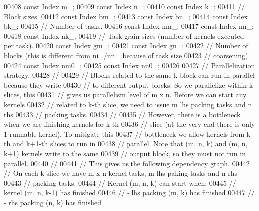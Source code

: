 \begin{DoxyCode}
00408     \textcolor{keyword}{const} Index m\_;
00409     \textcolor{keyword}{const} Index n\_;
00410     \textcolor{keyword}{const} Index k\_;
00411     \textcolor{comment}{// Block sizes.}
00412     \textcolor{keyword}{const} Index bm\_;
00413     \textcolor{keyword}{const} Index bn\_;
00414     \textcolor{keyword}{const} Index bk\_;
00415     \textcolor{comment}{// Number of tasks.}
00416     \textcolor{keyword}{const} Index nm\_;
00417     \textcolor{keyword}{const} Index nn\_;
00418     \textcolor{keyword}{const} Index nk\_;
00419     \textcolor{comment}{// Task grain sizes (number of kernels executed per task).}
00420     \textcolor{keyword}{const} Index gm\_;
00421     \textcolor{keyword}{const} Index gn\_;
00422     \textcolor{comment}{// Number of blocks (this is different from ni\_/nn\_ because of task size}
00423     \textcolor{comment}{// coarsening).}
00424     \textcolor{keyword}{const} Index nm0\_;
00425     \textcolor{keyword}{const} Index nn0\_;
00426 
00427     \textcolor{comment}{// Parallelization strategy.}
00428     \textcolor{comment}{//}
00429     \textcolor{comment}{// Blocks related to the same k block can run in parallel because they write}
00430     \textcolor{comment}{// to different output blocks. So we parallelize within k slices, this}
00431     \textcolor{comment}{// gives us parallelism level of m x n. Before we can start any kernels}
00432     \textcolor{comment}{// related to k-th slice, we need to issue m lhs packing tasks and n rhs}
00433     \textcolor{comment}{// packing tasks.}
00434     \textcolor{comment}{//}
00435     \textcolor{comment}{// However, there is a bottleneck when we are finishing kernels for k-th}
00436     \textcolor{comment}{// slice (at the very end there is only 1 runnable kernel). To mitigate this}
00437     \textcolor{comment}{// bottleneck we allow kernels from k-th and k+1-th slices to run in}
00438     \textcolor{comment}{// parallel. Note that (m, n, k) and (m, n, k+1) kernels write to the same}
00439     \textcolor{comment}{// output block, so they must not run in parallel.}
00440     \textcolor{comment}{//}
00441     \textcolor{comment}{// This gives us the following dependency graph.}
00442     \textcolor{comment}{// On each k slice we have m x n kernel tasks, m lhs paking tasks and n rhs}
00443     \textcolor{comment}{// packing tasks.}
00444     \textcolor{comment}{// Kernel (m, n, k) can start when:}
00445     \textcolor{comment}{//  - kernel (m, n, k-1) has finished}
00446     \textcolor{comment}{//  - lhs packing (m, k) has finished}
00447     \textcolor{comment}{//  - rhs packing (n, k) has finished}

\end{DoxyCode}
